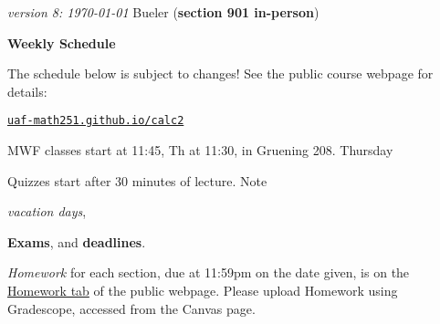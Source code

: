 \documentclass[12pt]{article}
\newcommand{\vacinline}[1]{{\color{OliveGreen} \textsl{#1}}}
\newcommand{\vac}[1]{\strut {\small {\vacinline{#1}}}}
\newcommand{\due}[1]{\strut {\color{BrickRed} \textsl{#1}}}
\newcommand{\dl}[1]{{\small \color{Purple} \textbf{#1}}}
\newcommand{\ee}[1]{\strut {\color{Blue} \textbf{#1}}}
\newcommand{\qq}[1]{\strut {\color{RedOrange} #1}}
\begin{document}
\noindent\footnotesize \emph{version 8: \today} \normalsize \hfill Bueler (\textbf{section 901 in-person})

\bigskip
\centerline{\Large \textbf{Weekly Schedule}}

\bigskip
The schedule below is subject to changes!  See the public course webpage for details:

\medskip

\centerline{\href{https://uaf-math251.github.io/calc2/}{\texttt{uaf-math251.github.io/calc2}}}

\noindent MWF classes start at 11:45, Th at 11:30, in Gruening 208.  Thursday \qq{Quizzes} start after 30 minutes of lecture.  Note \vac{vacation days}, \ee{Exams}, and \dl{deadlines}.  \due{Homework} for each section, due at 11:59pm on the date given, is on the \href{https://uaf-math251.github.io/calc2/}{Homework tab} of the public webpage.  Please upload Homework using Gradescope, accessed from the Canvas page.

\bigskip
\end{document}
